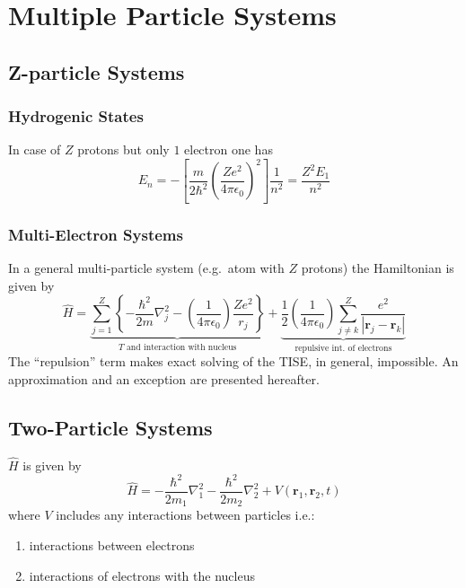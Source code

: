 \section{Multiple Particle Systems}
\subsection{Z-particle Systems}
\subsubsection{Hydrogenic States}
In case of $Z$ protons but only $1$ electron one has
\begin{equation*}
    E_n = -\left[\frac{m}{2\hbar^2}{\left(\frac{Z e^2}{4\pi\epsilon_0}\right)}^2\right]\frac{1}{n^2} = \frac{Z^2 E_1}{n^2}
\end{equation*}
\subsubsection{Multi-Electron Systems}
In a general multi-particle system (e.g.\ atom with $Z$ protons) the Hamiltonian is given by
    {\small     %
        \begin{equation*}
            \widehat{H}=\underbrace{\sum_{j=1}^{Z}\left\{-\frac{\hbar^{2}}{2m}\nabla_{j}^{2}-\left(\frac{1}{4\pi \epsilon_{0}}\right)\frac{Ze^{2}}{r_{j}}\right\}}_{T\text{ and interaction with nucleus}} + \underbrace{\frac{1}{2}\left(\frac{1}{4\pi \epsilon_{0}}\right)\sum_{j\neq k}^{Z}\frac{e^{2}}{\left|\mathbf{r}_{j}-\mathbf{r}_{k}\right|}}_{\text{repulsive int.\ of electrons}}
        \end{equation*}
    }
The ``repulsion'' term makes exact solving of the TISE, in general, impossible. An approximation and an exception are presented hereafter.

\subsection{Two-Particle Systems}
$\widehat{H}$ is given by
\begin{equation*}
    \widehat{H}=-\frac{\hbar^{2}}{2m_{1}}\nabla_{1}^{2}-\frac{\hbar^{2}}{2m_{2}}\nabla_{2}^{2}+V(\mathbf{r}_{1},\mathbf{r}_{2},t)
\end{equation*}
where $V$ includes any interactions between particles i.e.:
\begin{enumerate}
    \item interactions between  electrons
    \item interactions of electrons with the nucleus
\end{enumerate}


